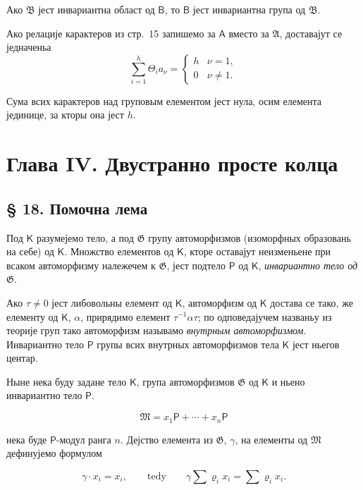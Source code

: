 \documentclass[11pt]{article}
\begin{document}
Ако \(\mathfrak B\) јест инвариантна област од \(\mathsf B\), то \(\mathsf B\) јест инвариантна група од \(\mathfrak B\).

Ако релације карактеров из стр.~15 запишемо за \(\mathsf A\) вместо за \(\mathfrak A\), доставајут се једначеньа
\[
\sum_{i=1}^{h} \Theta_i a_\nu =
\begin{cases}
h & \nu=1,\\
0 & \nu\ne 1.
\end{cases}
\]

Сума всих карактеров над груповым елементом јест нула, осим елемента јединице, за кторы она јест \(h\).

\section*{Глава IV. Двустранно просте колца}\label{kapitel-iv.-zweiseitig-einfache-ringe}

\subsection*{§ 18. Помочна лема}\label{ein-hilfssatz}

Под \(\mathsf K\) разумејемо тело, а под \(\mathfrak G\) групу автоморфизмов (изоморфных образовань на себе) од \(\mathsf K\). Множство елементов од \(\mathsf K\), кторе оставајут неизменьене при всаком автоморфизму належечем к \(\mathfrak G\), јест подтело \(\mathsf P\) од \(\mathsf K\), \emph{инвариантно тело од} \(\mathfrak G\).

Ако \(\tau\ne 0\) јест либовольны елемент од \(\mathsf K\), автоморфизм од \(\mathsf K\) достава се тако, же елементу од \(\mathsf K\), \(\alpha\), прирядимо елемент \(\tau^{-1}\alpha\tau\); по одповедајучем названьу из теорије груп тако автоморфизм называмо \emph{внутрным автоморфизмом}. Инвариантно тело \(\mathsf P\) групы всих внутрных автоморфизмов тела \(\mathsf K\) јест ньегов центар.

Ныне нека буду задане тело \(\mathsf K\), група автоморфизмов \(\mathfrak G\) од \(\mathsf K\) и ньено инвариантно тело \(\mathsf P\).

\[
\mathfrak M=x_1\mathsf P+\cdots+x_n\mathsf P
\]

нека буде \(\mathsf P\)-модул ранга \(n\). Дејство елемента из \(\mathfrak G\), \(\gamma\), на елементы од \(\mathfrak M\) дефинујемо формулом

\[
\gamma\cdot x_i=x_i,\qquad\text{tedy}\qquad
\gamma\sum \varrho_i x_i=\sum \varrho_i x_i.
\]
\end{document}
